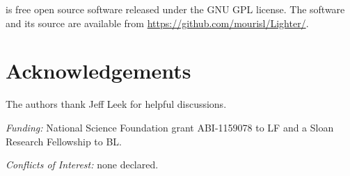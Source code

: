 \documentclass[10pt]{article}
\begin{document}


\tool is free open source software released under the GNU GPL license.  The software and its source are available from \url{https://github.com/mourisl/Lighter/}.

\section*{Acknowledgements}
The authors thank Jeff Leek for helpful discussions.

\noindent\emph{Funding:} National Science Foundation grant ABI-1159078 to LF and a Sloan Research Fellowship to BL.

\noindent\emph{Conflicts of Interest:} none declared.



\end{document}
